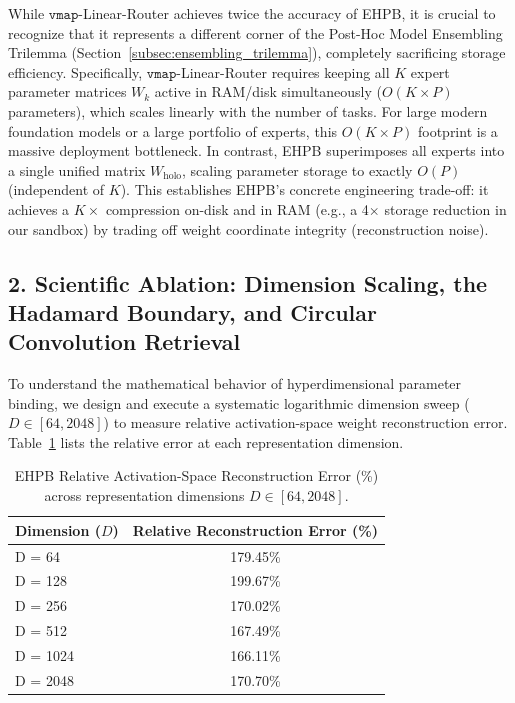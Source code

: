 While $\mathtt{vmap}$-Linear-Router achieves twice the accuracy of EHPB, it is crucial to recognize that it represents a different corner of the Post-Hoc Model Ensembling Trilemma (Section~\ref{subsec:ensembling_trilemma}), completely sacrificing storage efficiency. Specifically, $\mathtt{vmap}$-Linear-Router requires keeping all $K$ expert parameter matrices $W_k$ active in RAM/disk simultaneously ($O(K \times P)$ parameters), which scales linearly with the number of tasks. For large modern foundation models or a large portfolio of experts, this $O(K \times P)$ footprint is a massive deployment bottleneck. In contrast, EHPB superimposes all experts into a single unified matrix $W_{\text{holo}}$, scaling parameter storage to exactly $O(P)$ (independent of $K$). This establishes EHPB's concrete engineering trade-off: it achieves a $K\times$ compression on-disk and in RAM (e.g., a 4$\times$ storage reduction in our sandbox) by trading off weight coordinate integrity (reconstruction noise).

\subsection{2. Scientific Ablation: Dimension Scaling, the Hadamard Boundary, and Circular Convolution Retrieval}
\label{subsec:dimension_ablation}

To understand the mathematical behavior of hyperdimensional parameter binding, we design and execute a systematic logarithmic dimension sweep ($D \in [64, 2048]$) to measure relative activation-space weight reconstruction error. Table~\ref{tab:dimension_sweep} lists the relative error at each representation dimension.

\begin{table}[h]
\caption{EHPB Relative Activation-Space Reconstruction Error (\%) across representation dimensions $D \in [64, 2048]$.}
\label{tab:dimension_sweep}
\vskip 0.15in
\begin{center}
\begin{small}
\begin{sc}
\begin{tabular}{lc}
\toprule
Dimension ($D$) & Relative Reconstruction Error (\%) \\
\midrule
D = 64 & 179.45\% \\
D = 128 & 199.67\% \\
D = 256 & 170.02\% \\
D = 512 & 167.49\% \\
D = 1024 & 166.11\% \\
D = 2048 & 170.70\% \\
\bottomrule
\end{tabular}
\end{sc}
\end{small}
\end{center}
\vskip -0.1in
\end{table}

